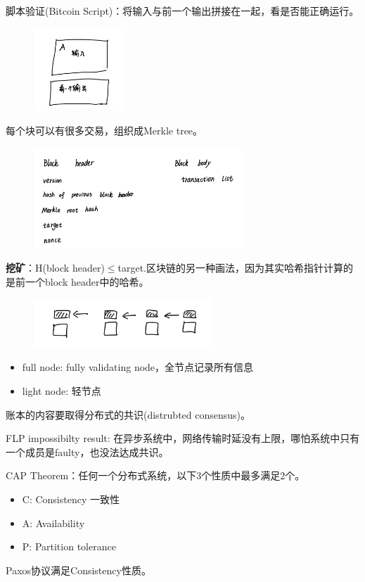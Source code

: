 \documentclass[10pt]{ctexart}
\begin{document}
脚本验证(Bitcoin Script)：将输入与前一个输出拼接在一起，看是否能正确运行。
\begin{figure}[H]
    \centering
    \includegraphics[width=0.3\textwidth]{courses/区块链技术与应用/lecture4/img4.png} 
\end{figure}
每个块可以有很多交易，组织成Merkle tree。
\begin{figure}[H]
    \centering
    \includegraphics[width=0.7\textwidth]{courses/区块链技术与应用/lecture4/img5.png} 
\end{figure}
\textbf{挖矿}：H(block header)$\le$target.区块链的另一种画法，因为其实哈希指针计算的是前一个block header中的哈希。
\begin{figure}[H]
    \centering
    \includegraphics[width=0.6\textwidth]{courses/区块链技术与应用/lecture4/img6.png} 
\end{figure}
\begin{itemize}
    \item full node: fully validating node，全节点记录所有信息
    \item light node: 轻节点
\end{itemize}

账本的内容要取得分布式的共识(distrubted consensus)。

FLP impossibilty result: 在异步系统中，网络传输时延没有上限，哪怕系统中只有一个成员是faulty，也没法达成共识。

CAP Theorem：任何一个分布式系统，以下3个性质中最多满足2个。
\begin{itemize}
    \item C: Consistency 一致性
    \item A: Availability
    \item P: Partition tolerance
\end{itemize}
Paxos协议满足Consistency性质。
\end{document}
